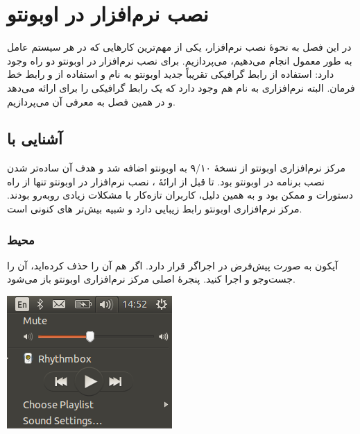 \chapter{نصب نرم‌افزار در اوبونتو}
در این فصل به نحوهٔ نصب نرم‌افزار، یکی از مهم‌ترین کارهایی که در هر سیستم عامل به طور معمول انجام می‌دهیم، می‌پردازیم. برای نصب نرم‌افزار در اوبونتو دو راه وجود دارد: استفاده از رابط گرافیکی تقریباً جدید اوبونتو به نام  و استفاده از  و رابط خط فرمان. البته نرم‌افزاری به نام  هم وجود دارد که یک رابط گرافیکی را برای  ارائه می‌دهد و در همین فصل به معرفی آن می‌پردازیم.

\section[آشنایی با Center Software Ubuntu]{آشنایی با }
مرکز نرم‌افزاری اوبونتو از نسخهٔ ۹/۱۰ به اوبونتو اضافه شد و هدف آن ساده‌تر شدن نصب برنامه در اوبونتو بود. تا قبل از ارائهٔ ، نصب نرم‌افزار در اوبونتو تنها از راه دستورات  و  ممکن بود و به همین دلیل، کاربران تازه‌کار با مشکلات زیادی روبه‌رو بودند. مرکز نرم‌افزاری اوبونتو رابط زیبایی دارد و شبیه بیش‌تر های کنونی است.

\subsection[محیط Center Software Ubuntu]{محیط }
آیکون  به صورت پیش‌فرض در اجراگر قرار دارد. اگر هم آن را حذف کرده‌اید، آن را جست‌وجو و اجرا کنید. پنجرهٔ اصلی مرکز نرم‌افزاری اوبونتو باز می‌شود.

\begin{center}
\includegraphics[scale=0.43]{pics/20.png}
\end{center}

